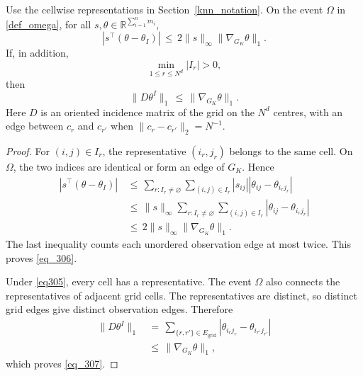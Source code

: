 \documentclass[twoside,11pt]{article}
\newenvironment{revision}{\color{revisionred}}{}
\begin{document}
\begin{revision}
\begin{lemma}
\label{lemma_15}
Use the cellwise representations in Section~\ref{knn_notation}.
On the event $\Omega$ in \eqref{def_omega}, for all
$s,\theta\in\mathbb R^{\sum_{i=1}^n m_i}$,
\begin{equation}
\label{eq_306}
|s^\top(\theta-\theta_I)|
\,\leq\,2\|s\|_\infty\|\nabla_{G_K}\theta\|_1.
\end{equation}
If, in addition,
\begin{equation}
\label{eq305}
\min_{1\leq r\leq N^d}|I_r|>0,
\end{equation}
then
\begin{equation}
\label{eq_307}
\|D\theta^I\|_1\,\leq\,\|\nabla_{G_K}\theta\|_1.
\end{equation}
Here $D$ is an oriented incidence matrix of the grid on the
$N^d$ centres, with an edge between $c_r$ and $c_{r'}$ when
$\|c_r-c_{r'}\|_2=N^{-1}$.
\end{lemma}
\begin{proof}
For $(i,j)\in I_r$, the representative $(i_r,j_r)$ belongs to
the same cell. On $\Omega$, the two indices are identical or
form an edge of $G_K$. Hence
\begin{align*}
|s^\top(\theta-\theta_I)|
&\,\leq\,\sum_{r:I_r\ne\varnothing}
       \sum_{(i,j)\in I_r}|s_{ij}|
                     |\theta_{ij}-\theta_{i_rj_r}|\\
&\,\leq\,\|s\|_\infty
       \sum_{r:I_r\ne\varnothing}
       \sum_{(i,j)\in I_r}|\theta_{ij}-\theta_{i_rj_r}|\\
&\,\leq\,2\|s\|_\infty\|\nabla_{G_K}\theta\|_1.
\end{align*}
The last inequality counts each unordered observation edge
at most twice. This proves \eqref{eq_306}.

Under \eqref{eq305}, every cell has a representative. The event
$\Omega$ also connects the representatives of adjacent grid cells.
The representatives are distinct, so distinct grid edges give
distinct observation edges. Therefore
\begin{align*}
\|D\theta^I\|_1
&\,=\,\sum_{\{r,r'\}\in E_{\mathrm{grid}}}
             |\theta_{i_rj_r}-\theta_{i_{r'}j_{r'}}|\\
&\,\leq\,\|\nabla_{G_K}\theta\|_1,
\end{align*}
which proves \eqref{eq_307}.
\end{proof}
\end{revision}
\end{document}

